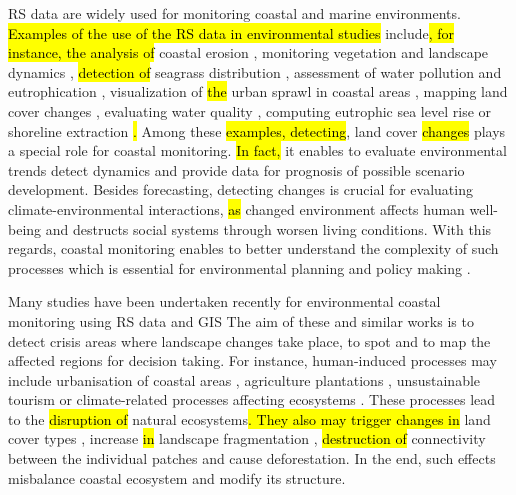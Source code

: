 \documentclass[jmse,article,submit,pdftex,moreauthors]{Definitions/mdpi}
\begin{document}
RS data are widely used for monitoring coastal and marine environments. \hl{Examples of the use of the RS data in environmental studies} include\hl{, for instance, the analysis of }coastal erosion \cite{MCCARROLL2024107146}, monitoring vegetation and landscape dynamics \cite{Munroe2022,Morgan}, \hl{detection of} seagrass distribution \cite{Traganos}, assessment of water pollution and\hl{ }eutrophication \cite{ZHU2024262}, visualization of \hl{the }urban sprawl in coastal areas \cite{su14095700}, mapping land cover changes \cite{Lemenkova202313}, evaluating water quality \cite{ZHU2022116187,Lemenkova202322,Kim}, computing eutrophic sea level rise or shoreline extraction \cite{MCALLISTER2022104102}\hl{. }Among these \hl{examples, detecting}, land cover \hl{changes} plays a special role for coastal monitoring. \hl{In fact,} it enables to evaluate environmental trends detect dynamics and provide data for prognosis of possible scenario development. Besides forecasting, detecting changes is crucial for evaluating climate-environmental interactions, \hl{as} changed environment affects human well-being and destructs social systems through worsen living conditions. With this regards,\hl{ }coastal monitoring enables to better understand the complexity of such processes which is essential for environmental planning and policy making \cite{MURRAY2000357,COUTTS2016637}.

Many studies have been undertaken recently for environmental coastal monitoring using RS data and GIS \cite{BISHOPTAYLOR2021112734} The aim of these and similar works is to detect crisis areas where landscape changes take place, to spot and to map the affected regions for decision taking. For instance, human-induced processes may include urbanisation of coastal areas \cite{ANTOS2007173}, agriculture plantations \cite{6723525}, unsustainable tourism \cite{WESTON200998,Howesetal} or climate-related processes affecting ecosystems \cite{Glenn,Lemenkova202221}. These processes lead to the \hl{disruption of} natural ecosystems\hl{. They also may trigger changes in} land cover types \cite{DPCOSTA2024101574}, increase \hl{in} landscape fragmentation \cite{Lemenkova202406}, \hl{destruction of} connectivity between the individual patches and cause deforestation. In the end, such effects misbalance coastal ecosystem and modify its structure.  
\end{document}
